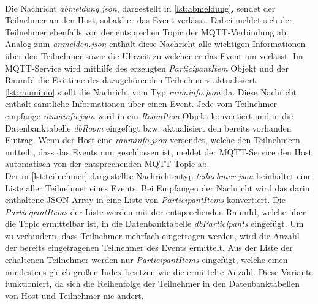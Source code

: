 \\
Die Nachricht \textit{abmeldung.json}, dargestellt in \cref{lst:abmeldung},   sendet der Teilnehmer an den Host, sobald er das Event verlässt. 
Dabei meldet sich der Teilnehmer ebenfalls von der entsprechen Topic der MQTT-Verbindung ab. 
Analog zum \textit{anmelden.json} enthält diese Nachricht alle wichtigen Informationen über den Teilnehmer sowie die Uhrzeit zu welcher er das Event um verlässt. 
Im MQTT-Service wird mithilfe des erzeugten \textit{ParticipantItem} Objekt und der RaumId die Exittime des dazugehörenden Teilnehmers aktualisiert.  
\\
\cref{lst:rauminfo} stellt die Nachricht vom Typ \textit{rauminfo.json} da. 
Diese Nachricht enthält sämtliche Informationen über einen Event. 
Jede vom Teilnehmer empfange \textit{rauminfo.json} wird in ein \textit{RoomItem} Objekt konvertiert und in die Datenbanktabelle \textit{dbRoom} eingefügt bzw. aktualisiert den bereits vorhanden Eintrag. 
Wenn der Host eine \textit{rauminfo.json} versendet, welche den Teilnehmern mitteilt, dass das Events nun geschlossen ist, meldet der MQTT-Service den Host automatisch von der entsprechenden MQTT-Topic ab.
\\
Der in \cref{lst:teilnehmer} dargestellte Nachrichtentyp \textit{teilnehmer.json} beinhaltet eine Liste aller Teilnehmer eines Events. 
Bei Empfangen der Nachricht wird das darin enthaltene JSON-Array in eine Liste von \textit{ParticipantItems} konvertiert. 
Die \textit{ParticipantItems} der Liste werden mit der entsprechenden RaumId, welche über die Topic ermittelbar ist, in die Datenbanktabelle \textit{dbParticipants} eingefügt. 
Um zu verhindern, dass Teilnehmer mehrfach eingetragen werden, wird die Anzahl der bereits eingetragenen Teilnehmer des Events ermittelt. 
Aus der Liste der erhaltenen Teilnehmer werden nur \textit{ParticipantItems} eingefügt, welche einen mindestens gleich großen Index besitzen wie die ermittelte Anzahl. 
Diese Variante funktioniert, da sich die Reihenfolge der Teilnehmer in den Datenbanktabellen von Host und Teilnehmer nie ändert.

